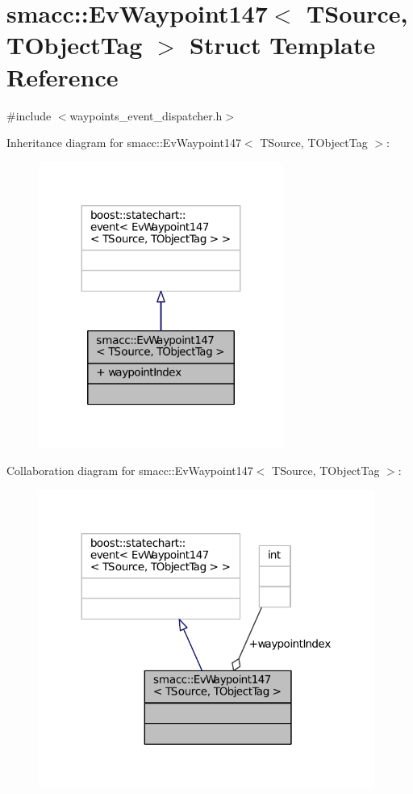 \hypertarget{structsmacc_1_1EvWaypoint147}{}\section{smacc\+:\+:Ev\+Waypoint147$<$ T\+Source, T\+Object\+Tag $>$ Struct Template Reference}
\label{structsmacc_1_1EvWaypoint147}


{\ttfamily \#include $<$waypoints\+\_\+event\+\_\+dispatcher.\+h$>$}



Inheritance diagram for smacc\+:\+:Ev\+Waypoint147$<$ T\+Source, T\+Object\+Tag $>$\+:
\nopagebreak
\begin{figure}[H]
\begin{center}
\leavevmode
\includegraphics[width=227pt]{structsmacc_1_1EvWaypoint147__inherit__graph}
\end{center}
\end{figure}


Collaboration diagram for smacc\+:\+:Ev\+Waypoint147$<$ T\+Source, T\+Object\+Tag $>$\+:
\nopagebreak
\begin{figure}[H]
\begin{center}
\leavevmode
\includegraphics[width=312pt]{structsmacc_1_1EvWaypoint147__coll__graph}
\end{center}
\end{figure}
